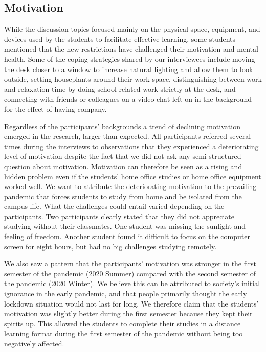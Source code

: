 \documentclass{sigchi}
\begin{document}
\subsection{Motivation}
While the discussion topics focused mainly on the physical space, equipment, and devices used by the students to facilitate effective learning, some students mentioned that the new restrictions have challenged their motivation and mental health. Some of the coping strategies shared by our interviewees include moving the desk closer to a window to increase natural lighting and allow them to look outside, setting houseplants around their work-space, distinguishing between work and relaxation time by doing school related work strictly at the desk, and connecting with friends or colleagues on a video chat left on in the background for the effect of having company.

Regardless of the participants' backgrounds a trend of declining motivation emerged in the research, larger than expected. All participants referred several times during the interviews to observations that they experienced a deteriorating level of motivation despite the fact that we did not ask any semi-structured question about motivation. Motivation can therefore be seen as a rising and hidden problem even if the students' home office studies or home office equipment worked well. We want to attribute the deteriorating motivation to the prevailing pandemic that forces students to study from home and be isolated from the campus life. What the challenges could entail varied depending on the participants. Two participants clearly stated that they did not appreciate studying without their classmates. One student was missing the sunlight and feeling of freedom. Another student found it difficult to focus on the computer screen for eight hours, but had no big challenges studying remotely. 

We also saw a pattern that the participants' motivation was stronger in the first semester of the pandemic (2020 Summer) compared with the second semester of the pandemic (2020 Winter). We believe this can be attributed to society’s initial ignorance in the early pandemic, and that people primarily thought the early lockdown situation would not last for long. We therefore claim that the students' motivation was slightly better during the first semester because they kept their spirits up. This allowed the students to complete their studies in a distance learning format during the first semester of the pandemic without being too negatively affected.
\end{document}

